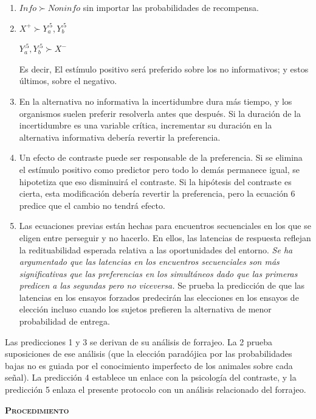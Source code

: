 \documentclass[a4paper,12pt]{article}
\begin{document}
\begin{enumerate}
	\item $Info \succ Noninfo$ sin importar las probabilidades de recompensa.
	\item $X^+ \succ Y^{{.}5}_a, Y^{{.}5}_b$

$Y^{{.}5}_a, Y^{{.}5}_b \succ X^-$

Es decir, El estímulo positivo será preferido sobre los no informativos; y estos últimos, sobre el negativo.
	\item En la alternativa no informativa la incertidumbre dura más tiempo, y los organismos suelen preferir resolverla antes que después. Si la duración de la incertidumbre es una variable crítica, incrementar su duración en la alternativa informativa debería revertir la preferencia.
	\item Un efecto de contraste puede ser responsable de la preferencia. Si se elimina el estímulo positivo como predictor pero todo lo demás permanece igual, se hipotetiza que eso disminuirá el contraste. Si la hipótesis del contraste es cierta, esta modificación debería revertir la preferencia, pero la ecuación 6 predice que el cambio no tendrá efecto.
	\item Las ecuaciones previas están hechas para encuentros secuenciales en los que se eligen entre perseguir y no hacerlo. En ellos, las latencias de respuesta reflejan la redituabilidad esperada relativa a las oportunidades del entorno. {\itshape Se ha argumentado que las latencias en los encuentros secuenciales son más significativas que las preferencias en los simultáneos dado que las primeras predicen a las segundas pero no viceversa.} Se prueba la predicción de que las latencias en los ensayos forzados predecirán las elecciones en los ensayos de elección incluso cuando los sujetos prefieren la alternativa de menor probabilidad de entrega.
\end{enumerate}

Las predicciones 1 y 3 se derivan de su análisis de forrajeo. La 2 prueba suposiciones de ese análisis (que la elección paradójica por las probabilidades bajas no es guiada por el conocimiento imperfecto de los animales sobre cada señal). La predicción 4 establece un enlace con la psicología del contraste, y la predicción 5 enlaza el presente protocolo con un análisis relacionado del forrajeo.

{\scshape\bfseries Procedimiento}
\end{document}
